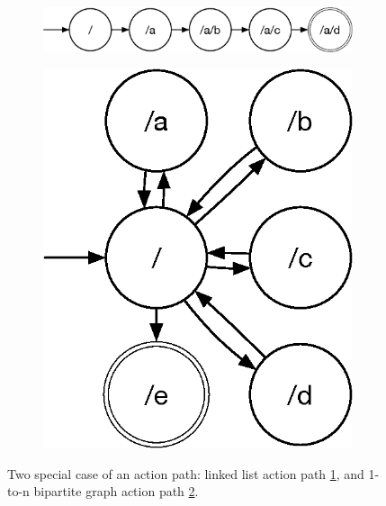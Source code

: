 \begin{figure}[H]
    \centering

\begin{subfigure}[b]{0.55\textwidth}
    \includegraphics[width=1\textwidth]{figures/linked-list}
    \caption{}
    \label{fig:sim-action-1}
\end{subfigure}
    
\begin{subfigure}[b]{0.23\textwidth}
    \includegraphics[width=1\textwidth]{figures/1ton}
    \caption{}
    \label{fig:sim-action-2}
\end{subfigure}

\caption{Two special case of an action path: linked list action path \ref{fig:sim-action-1}, and 
1-to-n bipartite graph action path \ref{fig:sim-action-2}.}
\label{fig:sim-action-path}
\end{figure}


